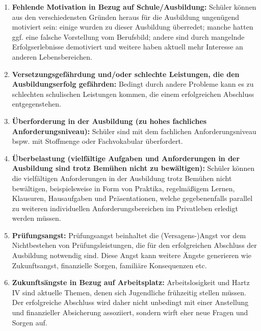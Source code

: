 \begin{enumerate}
	\item \textbf{Fehlende Motivation in Bezug auf Schule/Ausbildung:} Schüler können aus den verschiedensten Gründen heraus für die Ausbildung ungenügend motiviert sein: einige wurden zu dieser Ausbildung überredet; manche hatten ggf. eine falsche Vorstellung vom Berufsbild; andere sind durch mangelnde Erfolgserlebnisse demotiviert und weitere haben aktuell mehr Interesse an anderen Lebensbereichen.
	\item \textbf{Versetzungsgefährdung und/oder schlechte Leistungen, die den Ausbildungserfolg gefährden:} Bedingt durch andere Probleme kann es zu schlechten schulischen Leistungen kommen, die einem erfolgreichen Abschluss entgegenstehen. 
	\item \textbf{Überforderung in der Ausbildung (zu hohes fachliches Anforderungsniveau):} Schüler sind mit dem fachlichen Anforderungsniveau bspw. mit Stoffmenge oder Fachvokabular überfordert.
	\item \textbf{Überbelastung (vielfältige Aufgaben und Anforderungen in der Ausbildung sind trotz Bemühen nicht zu bewältigen):} Schüler können die vielfältigen Anforderungen in der Ausbildung trotz Bemühen nicht bewältigen, beispielsweise in Form von Praktika, regelmäßigem Lernen, Klausuren, Hausaufgaben und Präsentationen, welche gegebenenfalls parallel zu weiteren individuellen Anforderungsbereichen im Privatleben erledigt werden müssen.
	\item \textbf{Prüfungsangst:} Prüfungsangst beinhaltet die (Versagens-)Angst vor dem Nichtbestehen von Prüfungsleistungen, die für den erfolgreichen Abschluss der Ausbildung notwendig sind. Diese Angst kann weitere Ängste generieren wie Zukunftsangst, finanzielle Sorgen, familiäre Konsequenzen etc.
	\item \textbf{Zukunftsängste in Bezug auf Arbeitsplatz:} Arbeitslosigkeit und Hartz IV sind aktuelle Themen, denen sich Jugendliche frühzeitig stellen müssen. Der erfolgreiche Abschluss wird daher nicht unbedingt mit einer Anstellung und finanzieller Absicherung assoziiert, sondern wirft eher neue Fragen und Sorgen auf.
\end{enumerate}


